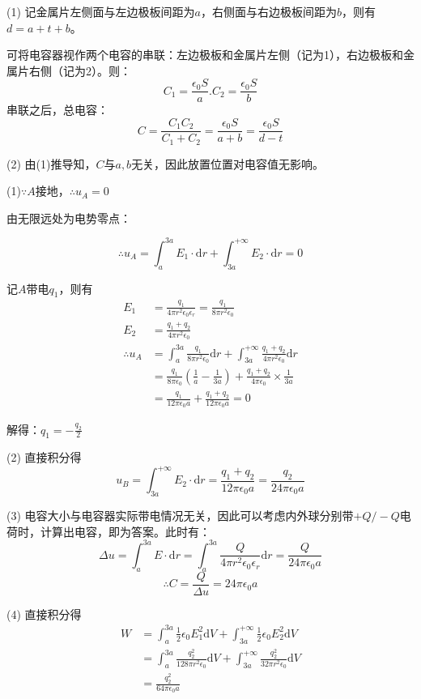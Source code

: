 \documentclass[b5paper,opensource,sourcefont,parskip]{qyxf-book}
\newcommand{\di}[1]{\mathrm{d}#1}
\begin{document}

\solve (1) 记金属片左侧面与左边极板间距为$ a $，右侧面与右边极板间距为$ b $，则有$ d=a+t+b $。

可将电容器视作两个电容的串联：左边极板和金属片左侧（记为1），右边极板和金属片右侧（记为2）。则：
\[C_1=\frac{\epsilon_0 S}{a}.C_2=\frac{\epsilon_0 S}{b}\]
串联之后，总电容：
\[C=\frac{C_1C_2}{C_1+C_2}=\frac{\epsilon_0 S}{a+b}=\frac{\epsilon_0 S}{d-t}\]

(2) 由(1)推导知，$ C $与$ a,b $无关，因此放置位置对电容值无影响。


\solve (1)$ \because A$接地，$ \therefore u_A=0 $

由无限远处为电势零点：

\begin{equation}
\therefore u_A=\int_a^{3a} E_1\cdot\di{r} +\int_{3a}^{+\infty} E_2\cdot\di{r} =0
\end{equation}

记$ A $带电$ q_1 $，则有
\begin{equation}
\begin{aligned}
E_1&=\frac{q_1}{4\pi r^2\epsilon_0\epsilon_r}=\frac{q_1}{8\pi r^2\epsilon_0}\\
E_2&=\frac{q_1+q_2}{4\pi r^2\epsilon_0}\\
\therefore u_A&=\int_a^{3a}\frac{q_1}{8\pi r^2\epsilon_0}\di{r}+\int_{3a}^{+\infty}\frac{q_1+q_2}{4\pi r^2\epsilon_0}\di{r}\\
&=\frac{q_1}{8\pi\epsilon_0}\left(\frac{1}{a}-\frac{1}{3a}\right)+\frac{q_1+q_2}{4\pi\epsilon_0}\times \frac{1}{3a}\\
&=\frac{q_1}{12\pi\epsilon_0a}+\frac{q_1+q_2}{12\pi\epsilon_0a}=0
\end{aligned}
\end{equation}

解得：$ q_1=-\frac{q_2}{2} $

(2)
直接积分得
\[u_B=\int_{3a}^{+\infty}E_2\cdot \di{r}=\frac{q_1+q_2}{12\pi\epsilon_0a}=\frac{q_2}{24\pi\epsilon_0a}\]

(3)
电容大小与电容器实际带电情况无关，因此可以考虑内外球分别带$ +Q/-Q $电荷时，计算出电容，即为答案。此时有：
\[\Delta u=\int_a^{3a}E\cdot \di{r}=\int_a^{3a}\frac{Q}{4\pi r^2\epsilon_0\epsilon_r}\di{r}=\frac{Q}{24\pi\epsilon_0a}\]
\[\therefore C=\frac{Q}{\Delta u}=24\pi\epsilon_0a\]

(4)
直接积分得
\begin{align*}
W&=\int_a^{3a}\frac{1}{2}\epsilon_0 E_1^2\di{V}+\int_{3a}^{+\infty}\frac{1}{2}\epsilon_0 E_2^2\di{V}\\
&=\int_a^{3a}\frac{q_2^2}{128\pi r^2\epsilon_0} \di{V}+\int_{3a}^{+\infty}\frac{q_2^2}{32\pi r^2\epsilon_0}\di{V}\\
&=\frac{q_2^2}{64\pi\epsilon_0a}
\end{align*}
\end{document}
